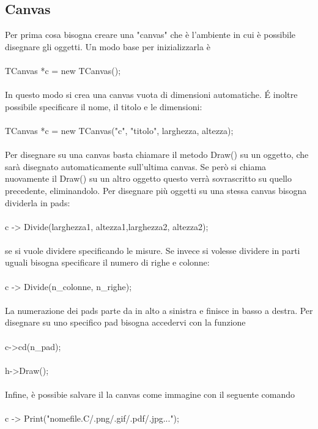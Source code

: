 \documentclass[10pt,a4paper]{article}
\begin{document}
\subsection{Canvas}
Per prima cosa bisogna creare una "canvas" che è l'ambiente in cui è possibile disegnare gli oggetti. Un modo base per inizializzarla è\\\\
TCanvas *c = new TCanvas();\\\\
In questo modo si crea una canvas vuota di dimensioni automatiche. \'{E} inoltre possibile specificare il nome, il titolo e le dimensioni:\\\\
TCanvas *c = new TCanvas("c", "titolo", larghezza, altezza);\\\\
Per disegnare su una canvas basta chiamare il metodo Draw() su un oggetto, che sarà disegnato automaticamente sull'ultima canvas. Se però si chiama nuovamente il Draw() su un altro oggetto questo verrà sovrascritto su quello precedente, eliminandolo. Per disegnare più oggetti su una stessa canvas bisogna dividerla in pads:\\\\
c -> Divide(larghezza1, altezza1,larghezza2, altezza2);\\\\
se si vuole dividere specificando le misure. Se invece si volesse dividere in parti uguali bisogna specificare il numero di righe e colonne:\\\\
c -> Divide(n\_colonne, n\_righe);\\\\
La numerazione dei pads parte da in alto a sinistra e finisce in basso a destra. Per disegnare su uno specifico pad bisogna accedervi con la funzione\\\\
c->cd(n\_pad);\\\\
h->Draw();\\\\
Infine, è possibie salvare il la canvas come immagine con il seguente comando\\\\
c -> Print("nomefile.C/.png/.gif/.pdf/.jpg...");\\
\end{document}
